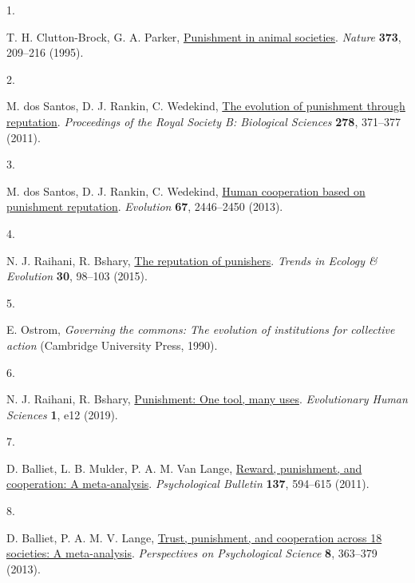\documentclass[
  man, donotrepeattitle,floatsintext]{apa6}
\newlength{\cslhangindent}
\newlength{\csllabelwidth}
\newlength{\cslentryspacingunit} %
\newenvironment{CSLReferences}[2] %
 {%
  \setlength{\parindent}{0pt}
  \ifodd #1
  \let\oldpar\par
  \def\par{\hangindent=\cslhangindent\oldpar}
  \fi
  \setlength{\parskip}{#2\cslentryspacingunit}
 }%
 {}
\newcommand{\CSLLeftMargin}[1]{\parbox[t]{\csllabelwidth}{#1}}
\newcommand{\CSLRightInline}[1]{\parbox[t]{\linewidth - \csllabelwidth}{#1}\break}
\begin{document}
\hypertarget{refs}{}
\begin{CSLReferences}{0}{0}
\leavevmode{}%
\CSLLeftMargin{1. }%
\CSLRightInline{T. H. Clutton-Brock, G. A. Parker, \href{https://doi.org/10.1038/373209a0}{Punishment in animal societies}. \emph{Nature} \textbf{373}, 209--216 (1995).}

\leavevmode{}%
\CSLLeftMargin{2. }%
\CSLRightInline{M. dos Santos, D. J. Rankin, C. Wedekind, \href{https://doi.org/10.1098/rspb.2010.1275}{The evolution of punishment through reputation}. \emph{Proceedings of the Royal Society B: Biological Sciences} \textbf{278}, 371--377 (2011).}

\leavevmode{}%
\CSLLeftMargin{3. }%
\CSLRightInline{M. dos Santos, D. J. Rankin, C. Wedekind, \href{https://www.jstor.org/stable/24032701}{Human cooperation based on punishment reputation}. \emph{Evolution} \textbf{67}, 2446--2450 (2013).}

\leavevmode{}%
\CSLLeftMargin{4. }%
\CSLRightInline{N. J. Raihani, R. Bshary, \href{https://doi.org/10.1016/j.tree.2014.12.003}{The reputation of punishers}. \emph{Trends in Ecology \& Evolution} \textbf{30}, 98--103 (2015).}

\leavevmode{}%
\CSLLeftMargin{5. }%
\CSLRightInline{E. Ostrom, \emph{Governing the commons: The evolution of institutions for collective action} (Cambridge University Press, 1990).}

\leavevmode{}%
\CSLLeftMargin{6. }%
\CSLRightInline{N. J. Raihani, R. Bshary, \href{https://doi.org/10.1017/ehs.2019.12}{Punishment: One tool, many uses}. \emph{Evolutionary Human Sciences} \textbf{1}, e12 (2019).}

\leavevmode{}%
\CSLLeftMargin{7. }%
\CSLRightInline{D. Balliet, L. B. Mulder, P. A. M. Van Lange, \href{https://doi.org/10.1037/a0023489}{Reward, punishment, and cooperation: A meta-analysis}. \emph{Psychological Bulletin} \textbf{137}, 594--615 (2011).}

\leavevmode{}%
\CSLLeftMargin{8. }%
\CSLRightInline{D. Balliet, P. A. M. V. Lange, \href{https://doi.org/10.1177/1745691613488533}{Trust, punishment, and cooperation across 18 societies: A meta-analysis}. \emph{Perspectives on Psychological Science} \textbf{8}, 363--379 (2013).}


\end{CSLReferences}
\end{document}
